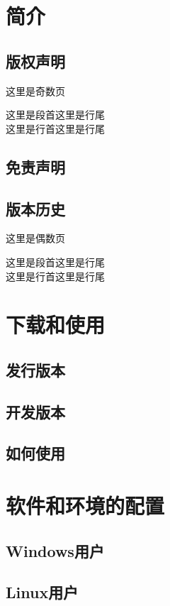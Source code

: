 \documentclass[doctor,openright]{buaathesis}
\begin{document}
\maketitle

\frontmatter
\tableofcontents

\mainmatter
\chapter{简介}
	\section{版权声明}
	这里是奇数页\par
	这里是段首\hfill 这里是行尾\\
	这里是行首\hfill 这里是行尾\\
	\section{免责声明}
	\newpage
	\section{版本历史}
	这里是偶数页\par
	这里是段首\hfill 这里是行尾\\
	这里是行首\hfill 这里是行尾\\
	
\chapter{下载和使用}
	\section{发行版本}
	\section{开发版本}
	\section{如何使用}
	
\chapter{软件和环境的配置}
	\section{Windows用户}
	\section{Linux用户}
\end{document}
